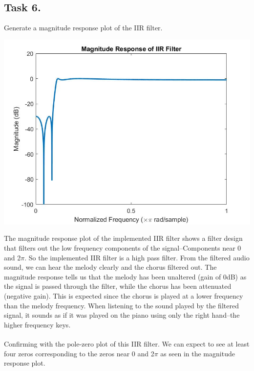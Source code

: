 \documentclass{article}
\begin{document}
    \subsection{Task 6.} Generate a magnitude response plot of the IIR filter.\\
        \begin{center}
            \includegraphics[width=\textwidth]{task6.jpg}
        \end{center}
        The magnitude response plot of the implemented IIR filter shows a filter design that filters out the low frequency components of the signal--Components near 0 and 2$\pi$. So the implemented IIR filter is a high pass filter. From the filtered audio sound, we can hear the melody clearly and the chorus filtered out. The magnitude response tells us that the melody has been unaltered (gain of 0dB) as the signal is passed through the filter, while the chorus has been attenuated (negative gain). This is expected since the chorus is played at a lower frequency than the melody frequency. When listening to the sound played by the filtered signal, it sounds as if it was played on the piano using only the right hand--the higher frequency keys.\\
        \vspace{5mm}\\
        Confirming with the pole-zero plot of this IIR filter. We can expect to see at least four zeros corresponding to the zeros near 0 and 2$\pi$ as seen in the magnitude response plot.
\end{document}
